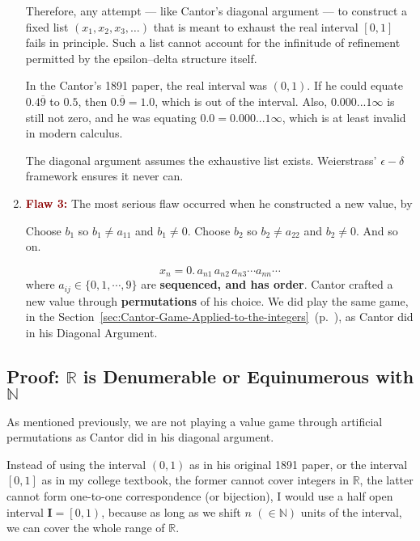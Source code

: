 \documentclass[12pt]{article}
\theoremstyle{definition} %
\numberwithin{equation}{section}
\newcommand{\boldred}[2]			   
{\textbf{\textcolor{darkred}{#1 #2}}}
\newcommand{\customref}[2]{\ref{#1:#2} \,\nameref{#1:#2}(p.~\pageref{#1:#2})}
\begin{document}
\begin{enumerate}
Therefore, any attempt — like Cantor’s diagonal argument — to construct a fixed list \((x_1, x_2, x_3, \dots)\) that is meant to exhaust the real interval \([0,1]\) fails in principle. Such a list cannot account for the infinitude of refinement permitted by the epsilon–delta structure itself.

In the Cantor's 1891 paper, the real interval was \(\left(0, 1\right)\). If he could equate \(0.4\overline{9}\) to \(0.5\), then \(0.\overline{9} = 1.0 \), which is out of the interval. Also, \(0.000...1\infty\) is still not zero, and he was equating \(0.0 = 0.000...1\infty\), which is at least invalid in modern calculus.

The diagonal argument assumes the exhaustive list exists. Weierstrass’ \(\epsilon-\delta\) framework ensures it never can.

\item \boldred{Flaw}{3:} The most serious flaw occurred when he constructed a new value, by 
\begin{center}
Choose \(b_1\) so \(b_1 \neq a_{11}\) and \(b_1 \neq 0\). Choose \(b_2\) so \(b_2 \neq a_{22}\) and \(b_2 \neq 0\). And so on.
\end{center}
\[
x_n = 0.\,a_{n1}\,a_{n2}\,a_{n3} \cdots a_{nn}\cdots 
\]
where \(a_{ij} \in \{0, 1, \cdots, 9\}\) are \textbf{sequenced, and has order}. Cantor crafted a new value through \textbf{permutations} of his choice. We did play the same game, in the Section~\customref{sec}{Cantor-Game-Applied-to-the-integers}, as Cantor did in his Diagonal Argument.
\end{enumerate}

\subsection{Proof: \(\mathbb{R}\) is Denumerable or Equinumerous  with \(\mathbb{N}\)}
\label{sec:Proof-R-N}

As mentioned previously, we are not playing a value game through artificial permutations as Cantor did in his diagonal argument.

\vspace{1em}
Instead of using the interval \(\left(0, 1\right)\) as in his original 1891 paper, or the interval \([0, 1]\) as in my college textbook, the former cannot cover integers in \(\mathbb{R}\), the latter cannot form one-to-one correspondence (or bijection), I would use a half open interval \(\bm{I} = \left[0, 1\right)\), because as long as we shift \(n\) \(\left(\in \mathbb{N}\right)\) units of the interval, we can cover the whole range of \(\mathbb{R}\).
\end{document}
